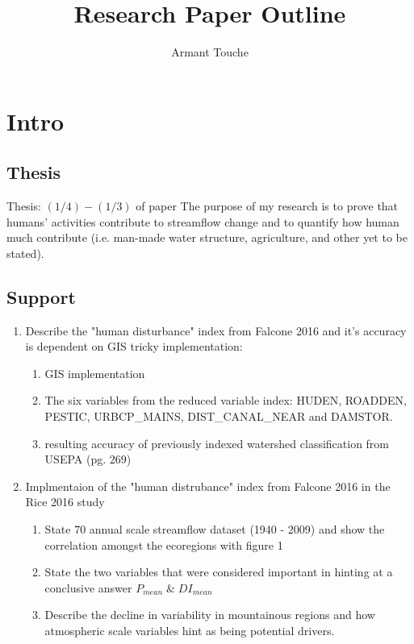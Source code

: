 \documentclass{article}
\begin{document}
\title{\vspace{-2cm}Research Paper Outline}
\author{Armant Touche}
\maketitle

\section{Intro}

    \subsection{Thesis} Thesis: $(1/4) - (1/3)$ of paper The purpose of my research is to prove that humans' activities contribute to streamflow change and to quantify how human much contribute (i.e. man-made water structure, agriculture, and other yet to be stated).

    \subsection{Support}
    \begin{enumerate}
        \item Describe the "human disturbance" index from Falcone 2016 and it's accuracy is dependent on GIS tricky implementation:
            \begin{enumerate}
                \item GIS implementation
                \item The six variables from the reduced variable index: HUDEN, ROADDEN, PESTIC, URBCP\_MAINS, DIST\_CANAL\_NEAR and DAMSTOR. 
                \item resulting accuracy of previously indexed watershed classification from USEPA (pg. 269)
            \end{enumerate}

        \item Implmentaion of the "human distrubance" index from Falcone 2016 in the Rice 2016 study
            \begin{enumerate}
                \item State 70 annual scale streamflow dataset (1940 - 2009) and show the correlation amongst the ecoregions with figure 1
                \item State the two variables that were considered important in hinting at a conclusive answer $P_\textit{mean} \;\&\; {DI}_\textit{mean}$ 
                \item Describe the decline in variability in mountainous regions and how atmospheric scale variables hint as being potential drivers. 
            \end{enumerate}

    \end{enumerate}
\end{document}
